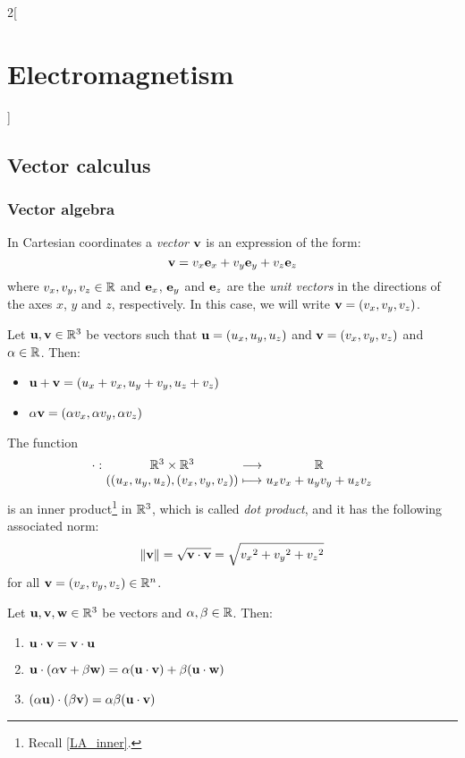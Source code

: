 \documentclass[../../../main.tex]{subfiles}
\begin{document}
\begin{multicols}{2}[\section{Electromagnetism}]
  \subsection{Vector calculus}
  \subsubsection{Vector algebra}
  \begin{definition}
    In Cartesian coordinates a \emph{vector} $\boldsymbol{\mathrm{v}}$ is an expression of the form: $$\boldsymbol{\mathrm{v}}=v_x\boldsymbol{\mathrm{e}}_x+v_y\boldsymbol{\mathrm{e}}_y+v_z\boldsymbol{\mathrm{e}}_z$$
    where $v_x,v_y,v_z\in\mathbb{R}$ and $\boldsymbol{\mathrm{e}}_x$, $\boldsymbol{\mathrm{e}}_y$ and $\boldsymbol{\mathrm{e}}_z$ are the \emph{unit vectors} in the directions of the axes $x$, $y$ and $z$, respectively. In this case, we will write $\boldsymbol{\mathrm{v}}=(v_x,v_y,v_z)$.
  \end{definition}
  \begin{proposition}
    Let $\boldsymbol{\mathrm{u}},\boldsymbol{\mathrm{v}}\in\mathbb{R}^3$ be vectors such that $\boldsymbol{\mathrm{u}}=(u_x,u_y,u_z)$ and $\boldsymbol{\mathrm{v}}=(v_x,v_y,v_z)$ and $\alpha\in\mathbb{R}$. Then:
    \begin{itemize}
      \item $\boldsymbol{\mathrm{u}}+\boldsymbol{\mathrm{v}}=(u_x+v_x,u_y+v_y,u_z+v_z)$
      \item $\alpha\boldsymbol{\mathrm{v}}=(\alpha v_x,\alpha v_y,\alpha v_z)$
    \end{itemize}
  \end{proposition}
  \begin{proposition}
    The function $$\function{\cdot}{\RR^3\times\RR^3}{\RR}{((u_x,u_y,u_z),(v_x,v_y,v_z))}{u_xv_x+u_yv_y+u_zv_z}$$ is an inner product\footnote{Recall \cref{LA_inner}.} in $\mathbb{R}^3$, which is called \emph{dot product}, and it has the following associated norm: $$\|\boldsymbol{\mathrm{v}}\|=\sqrt{\boldsymbol{\mathrm{v}}\cdot\boldsymbol{\mathrm{v}}}=\sqrt{{v_x}^2+{v_y}^2+{v_z}^2}$$ for all $\boldsymbol{\mathrm{v}}=(v_x,v_y,v_z)\in\mathbb{R}^n$.
  \end{proposition}
  \begin{proposition}
    Let $\boldsymbol{\mathrm{u}},\boldsymbol{\mathrm{v}},\boldsymbol{\mathrm{w}}\in\mathbb{R}^3$ be vectors and $\alpha,\beta \in\mathbb{R}$. Then:
    \begin{enumerate}
      \item $\boldsymbol{\mathrm{u}}\cdot\boldsymbol{\mathrm{v}}=\boldsymbol{\mathrm{v}}\cdot\boldsymbol{\mathrm{u}}$
      \item $\boldsymbol{\mathrm{u}}\cdot(\alpha\boldsymbol{\mathrm{v}}+\beta\boldsymbol{\mathrm{w}})=\alpha(\boldsymbol{\mathrm{u}}\cdot\boldsymbol{\mathrm{v}})+\beta(\boldsymbol{\mathrm{u}}\cdot\boldsymbol{\mathrm{w}})$
      \item $(\alpha\boldsymbol{\mathrm{u}})\cdot(\beta\boldsymbol{\mathrm{v}})=\alpha\beta(\boldsymbol{\mathrm{u}}\cdot\boldsymbol{\mathrm{v}})$

\end{enumerate}
\end{proposition}
\end{multicols}
\end{document}
